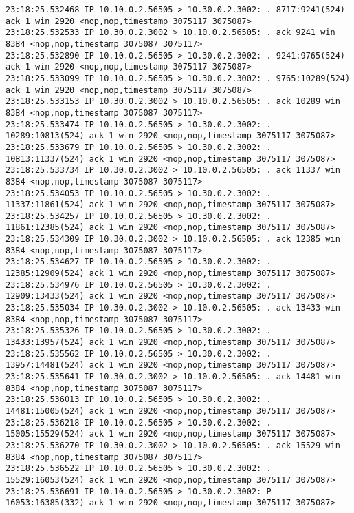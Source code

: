 \documentclass[a4paper,12pt]{article}
\begin{document}
\begin{Verbatim}
23:18:25.532468 IP 10.10.0.2.56505 > 10.30.0.2.3002: . 8717:9241(524) ack 1 win 2920 <nop,nop,timestamp 3075117 3075087>
23:18:25.532533 IP 10.30.0.2.3002 > 10.10.0.2.56505: . ack 9241 win 8384 <nop,nop,timestamp 3075087 3075117>
23:18:25.532890 IP 10.10.0.2.56505 > 10.30.0.2.3002: . 9241:9765(524) ack 1 win 2920 <nop,nop,timestamp 3075117 3075087>
23:18:25.533099 IP 10.10.0.2.56505 > 10.30.0.2.3002: . 9765:10289(524) ack 1 win 2920 <nop,nop,timestamp 3075117 3075087>
23:18:25.533153 IP 10.30.0.2.3002 > 10.10.0.2.56505: . ack 10289 win 8384 <nop,nop,timestamp 3075087 3075117>
23:18:25.533474 IP 10.10.0.2.56505 > 10.30.0.2.3002: . 10289:10813(524) ack 1 win 2920 <nop,nop,timestamp 3075117 3075087>
23:18:25.533679 IP 10.10.0.2.56505 > 10.30.0.2.3002: . 10813:11337(524) ack 1 win 2920 <nop,nop,timestamp 3075117 3075087>
23:18:25.533734 IP 10.30.0.2.3002 > 10.10.0.2.56505: . ack 11337 win 8384 <nop,nop,timestamp 3075087 3075117>
23:18:25.534053 IP 10.10.0.2.56505 > 10.30.0.2.3002: . 11337:11861(524) ack 1 win 2920 <nop,nop,timestamp 3075117 3075087>
23:18:25.534257 IP 10.10.0.2.56505 > 10.30.0.2.3002: . 11861:12385(524) ack 1 win 2920 <nop,nop,timestamp 3075117 3075087>
23:18:25.534309 IP 10.30.0.2.3002 > 10.10.0.2.56505: . ack 12385 win 8384 <nop,nop,timestamp 3075087 3075117>
23:18:25.534627 IP 10.10.0.2.56505 > 10.30.0.2.3002: . 12385:12909(524) ack 1 win 2920 <nop,nop,timestamp 3075117 3075087>
23:18:25.534976 IP 10.10.0.2.56505 > 10.30.0.2.3002: . 12909:13433(524) ack 1 win 2920 <nop,nop,timestamp 3075117 3075087>
23:18:25.535034 IP 10.30.0.2.3002 > 10.10.0.2.56505: . ack 13433 win 8384 <nop,nop,timestamp 3075087 3075117>
23:18:25.535326 IP 10.10.0.2.56505 > 10.30.0.2.3002: . 13433:13957(524) ack 1 win 2920 <nop,nop,timestamp 3075117 3075087>
23:18:25.535562 IP 10.10.0.2.56505 > 10.30.0.2.3002: . 13957:14481(524) ack 1 win 2920 <nop,nop,timestamp 3075117 3075087>
23:18:25.535641 IP 10.30.0.2.3002 > 10.10.0.2.56505: . ack 14481 win 8384 <nop,nop,timestamp 3075087 3075117>
23:18:25.536013 IP 10.10.0.2.56505 > 10.30.0.2.3002: . 14481:15005(524) ack 1 win 2920 <nop,nop,timestamp 3075117 3075087>
23:18:25.536218 IP 10.10.0.2.56505 > 10.30.0.2.3002: . 15005:15529(524) ack 1 win 2920 <nop,nop,timestamp 3075117 3075087>
23:18:25.536270 IP 10.30.0.2.3002 > 10.10.0.2.56505: . ack 15529 win 8384 <nop,nop,timestamp 3075087 3075117>
23:18:25.536522 IP 10.10.0.2.56505 > 10.30.0.2.3002: . 15529:16053(524) ack 1 win 2920 <nop,nop,timestamp 3075117 3075087>
23:18:25.536691 IP 10.10.0.2.56505 > 10.30.0.2.3002: P 16053:16385(332) ack 1 win 2920 <nop,nop,timestamp 3075117 3075087>

\end{Verbatim}
\end{document}
